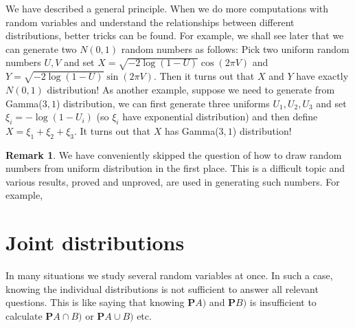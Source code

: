 \documentclass[preprint,  11pt]{amsart}
\theoremstyle{plain} %
\theoremstyle{definition} %
\newtheorem{remark}[theorem]{Remark}
\begin{document}
We have described a general principle. When we do more computations with random variables and understand the relationships between different distributions, better tricks can be found.  For example, we shall see later that we can generate two $N(0,1)$ random numbers as follows: Pick two uniform random numbers $U,V$ and set $X=\sqrt{-2\log(1-U)}\cos(2\pi V)$ and $Y=\sqrt{-2\log(1-U)}\sin(2\pi V)$. Then it turns out that $X$ and $Y$ have exactly $N(0,1)$ distribution! As another example, suppose we need to generate from Gamma($3,1$) distribution, we can first generate three uniforms $U_{1},U_{2},U_{3}$ and set $\xi_{i}=-\log(1-U_{i})$ (so $\xi_{i}$ have exponential distribution) and then define $X=\xi_{1}+\xi_{2}+\xi_{3}$. It turns out that $X$ has Gamma($3,1$) distribution!


\begin{remark}We have conveniently skipped the question of how to draw random numbers from uniform distribution in the first place. This is a difficult topic and various results, proved and unproved, are used in generating such numbers. For example, 
\end{remark}
\section{Joint distributions}
In many situations we study several random variables at once. In such a case, knowing the individual distributions is not sufficient to answer all relevant questions. This is like saying that knowing $\mathbf{P}A)$ and $\mathbf{P}B)$ is insufficient to calculate $\mathbf{P}A\cap B)$ or $\mathbf{P}A\cup B)$ etc.
\end{document}
